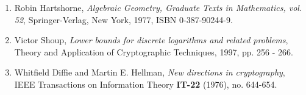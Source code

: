 



\begin{enumerate}[1]

	\item \label{Hartshorne} Robin Hartshorne, \textit{Algebraic Geometry, Graduate Texts in Mathematics, vol. 52}, Springer-Verlag, New York, 1977, ISBN 0-387-90244-9.   
	
	\item \label{VictorShoup} Victor Shoup, \textit{Lower bounds for discrete logarithms and related problems}, Theory and Application of Cryptographic Techniques, 1997, pp. 256 - 266. 
	
	\item \label{WhitfieldDiffieMartinHellman} Whitfield Diffie and Martin E. Hellman, \textit{New directions in cryptography}, IEEE Transactions on Information Theory \textbf{IT-22} (1976), no. 644-654.  
\end{enumerate}